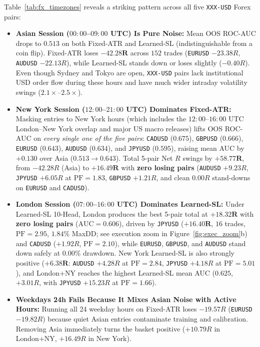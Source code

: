\documentclass{article}
\newcommand{\PF}{\mathrm{PF}}
\begin{document}
Table~\ref{tab:fx_timezones} reveals a striking pattern across all five \texttt{XXX-USD} Forex pairs:
\begin{itemize}
    \item \textbf{Asian Session ($00{:}00$--$09{:}00$ UTC) Is Pure Noise:} Mean OOS ROC-AUC drops to $\mathbf{0.513}$ on both Fixed-ATR and Learned-SL (indistinguishable from a coin flip). Fixed-ATR loses $\mathbf{-42.28R}$ across $152$ trades (\texttt{EURUSD} $-23.38R$, \texttt{AUDUSD} $-22.13R$), while Learned-SL stands down or loses slightly ($-0.40R$). Even though Sydney and Tokyo are open, \texttt{XXX-USD} pairs lack institutional USD order flow during these hours and have much wider intraday volatility swings ($2.1\times$--$2.5\times$).
    \item \textbf{New York Session ($12{:}00$--$21{:}00$ UTC) Dominates Fixed-ATR:} Masking entries to New York hours (which includes the $12{:}00$--$16{:}00$ UTC London--New York overlap and major US macro releases) lifts OOS ROC-AUC on \emph{every single one of the five pairs}: \texttt{CADUSD} ($0.675$), \texttt{GBPUSD} ($0.666$), \texttt{EURUSD} ($0.643$), \texttt{AUDUSD} ($0.634$), and \texttt{JPYUSD} ($0.595$), raising mean AUC by $+0.130$ over Asia ($0.513 \to \mathbf{0.643}$). Total 5-pair Net $R$ swings by $\mathbf{+58.77R}$, from $-42.28R$ (Asia) to $\mathbf{+16.49R}$ with \textbf{zero losing pairs} (\texttt{AUDUSD} $+9.23R$, \texttt{JPYUSD} $+6.05R$ at $\PF=1.83$, \texttt{GBPUSD} $+1.21R$, and clean $0.00R$ stand-downs on \texttt{EURUSD} and \texttt{CADUSD}).
    \item \textbf{London Session ($07{:}00$--$16{:}00$ UTC) Dominates Learned-SL:} Under Learned-SL 10-Head, London produces the best 5-pair total at $\mathbf{+18.32R}$ with \textbf{zero losing pairs} ($\mathrm{AUC} = 0.606$), driven by \texttt{JPYUSD} ($\mathbf{+16.40R}$, $16$ trades, $\PF = 2.95$, $1.84\%$ MaxDD; see execution zoom in Figure~\ref{fig:exec_zoom}b) and \texttt{CADUSD} ($+1.92R$, $\PF = 2.10$), while \texttt{EURUSD}, \texttt{GBPUSD}, and \texttt{AUDUSD} stand down safely at $0.00\%$ drawdown. New York Learned-SL is also strongly positive ($\mathbf{+6.38R}$: \texttt{AUDUSD} $+4.28R$ at $\PF=2.84$, \texttt{JPYUSD} $+4.18R$ at $\PF=5.01$), and London+NY reaches the highest Learned-SL mean AUC ($0.625$, $+3.01R$, with \texttt{JPYUSD} $+15.23R$ at $\PF=1.66$).
    \item \textbf{Weekdays 24h Fails Because It Mixes Asian Noise with Active Hours:} Running all 24 weekday hours on Fixed-ATR loses $-19.57R$ (\texttt{EURUSD} $-19.82R$) because quiet Asian entries contaminate training and calibration. Removing Asia immediately turns the basket positive ($+10.79R$ in London+NY, $+16.49R$ in New York).
\end{itemize}
\end{document}
